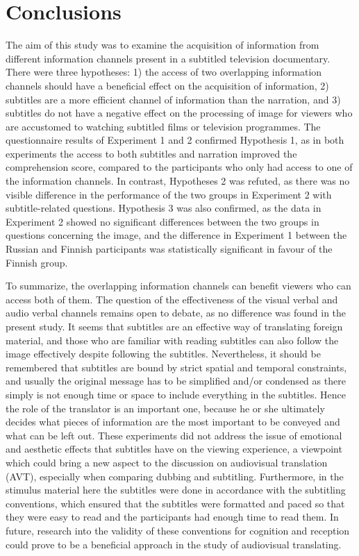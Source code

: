\documentclass[output=paper]{langsci/langscibook}
\begin{document}
\section{Conclusions}

The aim of this study was to examine the acquisition of information from different information channels present in a subtitled television documentary. There were three hypotheses: 1) the access of two overlapping information channels should have a beneficial effect on the acquisition of information, 2) subtitles are a more efficient channel of information than the narration, and 3) subtitles do not have a negative effect on the processing of image for viewers who are accustomed to watching subtitled films or television programmes. The questionnaire results of Experiment 1 and 2 confirmed Hypothesis 1, as in both experiments the access to both subtitles and narration improved the comprehension score, compared to the participants who only had access to one of the information channels. In contrast, Hypotheses 2 was refuted, as there was no visible difference in the performance of the two groups in Experiment 2 with subtitle-related questions. Hypothesis 3 was also confirmed, as the data in Experiment 2 showed no significant differences between the two groups in questions concerning the image, and the difference in Experiment 1 between the Russian and Finnish participants was statistically significant in favour of the Finnish group. 

To summarize, the overlapping information channels can benefit viewers who can access both of them. The question of the effectiveness of the visual verbal and audio verbal channels remains open to debate, as no difference was found in the present study. It seems that subtitles are an effective way of translating foreign material, and those who are familiar with reading subtitles can also follow the image effectively despite following the subtitles. Nevertheless, it should be remembered that subtitles are bound by strict spatial and temporal constraints, and usually the original message has to be simplified and/or condensed as there simply is not enough time or space to include everything in the subtitles. Hence the role of the translator is an important one, because he or she ultimately decides what pieces of information are the most important to be conveyed and what can be left out. These experiments did not address the issue of emotional and aesthetic effects that subtitles have on the viewing experience, a viewpoint which could bring a new aspect to the discussion on audiovisual translation (AVT), especially when comparing dubbing and subtitling. Furthermore, in the stimulus material here the subtitles were done in accordance with the subtitling conventions, which ensured that the subtitles were formatted and paced so that they were easy to read and the participants had enough time to read them. In future, research into the validity of these conventions for cognition and reception could prove to be a beneficial approach in the study of audiovisual translating.
\end{document}
